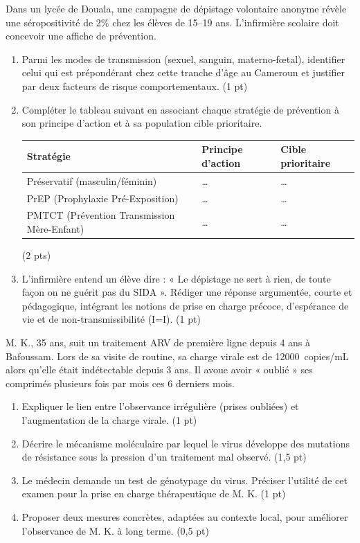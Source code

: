 \documentclass[11pt]{article}
\begin{document}
\begin{exercice}
Dans un lycée de Douala, une campagne de dépistage volontaire anonyme révèle une séropositivité de 2\% chez les élèves de 15--19 ans. L'infirmière scolaire doit concevoir une affiche de prévention.
\begin{enumerate}
    \item Parmi les modes de transmission (sexuel, sanguin, materno-fœtal), identifier celui qui est prépondérant chez cette tranche d'âge au Cameroun et justifier par deux facteurs de risque comportementaux. \hfill (1 pt)
    \item Compléter le tableau suivant en associant chaque stratégie de prévention à son principe d'action et à sa population cible prioritaire.
    \begin{tabular}{|p{3cm}|p{5cm}|p{4cm}|}
    \hline
    \textbf{Stratégie} & \textbf{Principe d'action} & \textbf{Cible prioritaire} \\
    \hline
    Préservatif (masculin/féminin) & \ldots & \ldots \\
    \hline
    PrEP (Prophylaxie Pré-Exposition) & \ldots & \ldots \\
    \hline
    PMTCT (Prévention Transmission Mère-Enfant) & \ldots & \ldots \\
    \hline
    \end{tabular}
    \hfill (2 pts)
    \item L'infirmière entend un élève dire : « Le dépistage ne sert à rien, de toute façon on ne guérit pas du SIDA ». Rédiger une réponse argumentée, courte et pédagogique, intégrant les notions de prise en charge précoce, d'espérance de vie et de non-transmissibilité (I=I). \hfill (1 pt)
\end{enumerate}
\end{exercice}

\begin{exercice}
M. K., 35 ans, suit un traitement ARV de première ligne depuis 4 ans à Bafoussam. Lors de sa visite de routine, sa charge virale est de \SI{12000}{copies/mL} alors qu'elle était indétectable depuis 3 ans. Il avoue avoir « oublié » ses comprimés plusieurs fois par mois ces 6 derniers mois.
\begin{enumerate}
    \item Expliquer le lien entre l'observance irrégulière (prises oubliées) et l'augmentation de la charge virale. \hfill (1 pt)
    \item Décrire le mécanisme moléculaire par lequel le virus développe des mutations de résistance sous la pression d'un traitement mal observé. \hfill (1,5 pt)
    \item Le médecin demande un test de génotypage du virus. Préciser l'utilité de cet examen pour la prise en charge thérapeutique de M. K. \hfill (1 pt)
    \item Proposer deux mesures concrètes, adaptées au contexte local, pour améliorer l'observance de M. K. à long terme. \hfill (0,5 pt)
\end{enumerate}
\end{exercice}
\end{document}
